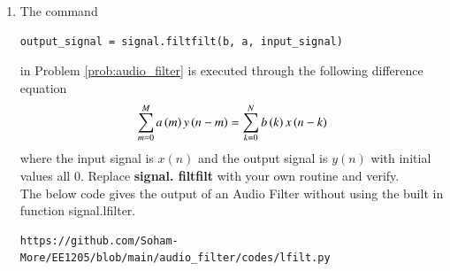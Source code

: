 \documentclass[journal,12pt,twocolumn]{IEEEtran}
\theoremstyle{remark}
\begin{document}
\begin{enumerate}[label=\thesection.\arabic*]
\item
The command
\begin{lstlisting}
output_signal = signal.filtfilt(b, a, input_signal)
\end{lstlisting}
in Problem \ref{prob:audio_filter} is executed through the following difference equation
\begin{equation}
\label{eq:iir_filter_gen}
    \sum _{m=0}^{M}a\left(m\right)y\left(n-m\right)=\sum _{k=0}^{N}b\left(k\right)x\left(n-k\right) 
\end{equation}
where the input signal is $x(n)$ and the output signal is $y(n)$ with initial values all 0. Replace
\textbf{signal. filtfilt} with your own routine and verify.\\

\solution The below code gives the output of an Audio Filter without using the built in function signal.lfilter.
\begin{lstlisting}
https://github.com/Soham-More/EE1205/blob/main/audio_filter/codes/lfilt.py
\end{lstlisting}



\end{enumerate}
\end{document}
